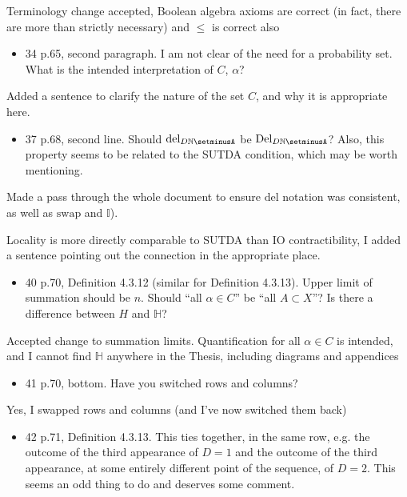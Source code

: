 Terminology change accepted, Boolean algebra axioms are correct (in fact, there are more than strictly necessary) and $\leq$ is correct also

\begin{itemize}
    \item 34 p.65, second paragraph. I am not clear of the need for a probability set. What is the intended interpretation of $C$, $\alpha$?
\end{itemize}

Added a sentence to clarify the nature of the set $C$, and why it is appropriate here.

\begin{itemize}
    \item 37 p.68, second line. Should $\mathrm{del}_{D \mathbb{N}\setminusA}$ be $\mathrm{Del}_{D \mathbb{N}\setminusA}$? Also, this property seems to be related to the SUTDA condition, which may be worth mentioning.
\end{itemize}

Made a pass through the whole document to ensure $\mathrm{del}$ notation was consistent, as well as $\mathrm{swap}$ and $\mathbb{I}$). 

Locality is more directly comparable to SUTDA than IO contractibility, I added a sentence pointing out the connection in the appropriate place.

\begin{itemize}
    \item  40 p.70, Definition 4.3.12 (similar for Definition 4.3.13). Upper limit of summation should be $n$. Should ``all $\alpha\in C$'' be ``all $A \subset X$''? Is there a difference between $H$ and $\mathbb{H}$?
\end{itemize}


Accepted change to summation limits. Quantification for all $\alpha \in C$ is intended, and I cannot find $\mathbb{H}$ anywhere in the Thesis, including diagrams and appendices

\begin{itemize}
    \item 41 p.70, bottom. Have you switched rows and columns?
\end{itemize}
 

Yes, I swapped rows and columns (and I've now switched them back)

\begin{itemize}
    \item 42 p.71, Definition 4.3.13. This ties together, in the same row, e.g. the outcome of the third appearance of $D = 1$ and the outcome of the third appearance, at some entirely different point of the sequence, of $D = 2$. This seems an odd thing to do and deserves some comment.
\end{itemize}

